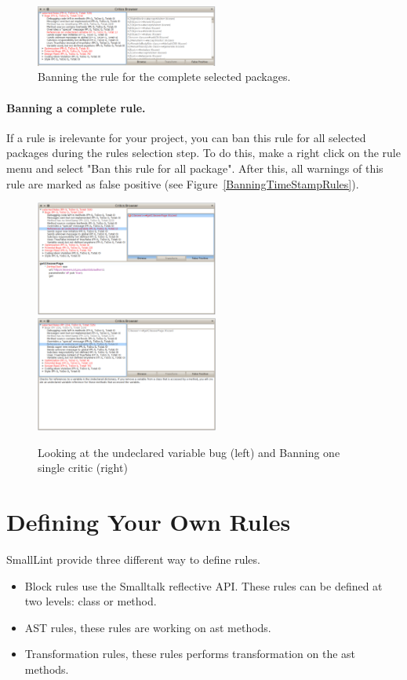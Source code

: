\documentclass[a4paper,10pt,twoside]{book}
\begin{document}
\begin{figure}[h]
\centering
\includegraphics[width=6cm]{BanningTimeStampRules}
\caption{Banning the rule for the complete selected packages.}
\end{figure}


\paragraph{Banning a complete rule.}
If a rule is irelevante for your project, you can ban this rule for all selected packages during the rules selection step. To do this, make a right click on the rule menu and select "Ban this rule for all package". After this, all  warnings of this rule are marked as false positive (see Figure~\ref{BanningTimeStampRules}). 



\begin{figure}[h]
\centering
\includegraphics[width=6cm]{OneUndeclaredRefence}\includegraphics[width=6cm]{BanningOneViolation}
\caption{Looking at the undeclared variable bug (left) and Banning one single critic (right)}
\end{figure}




\section{Defining Your Own Rules}
SmallLint provide three different way to define rules.
\begin{itemize}
	\item Block rules use the Smalltalk reflective API. These rules can be defined at two levels: class or method.
	\item AST rules, these rules are working on ast methods. 
	\item Transformation rules, these rules performs transformation on the ast methods.
\end{itemize}
\end{document}
